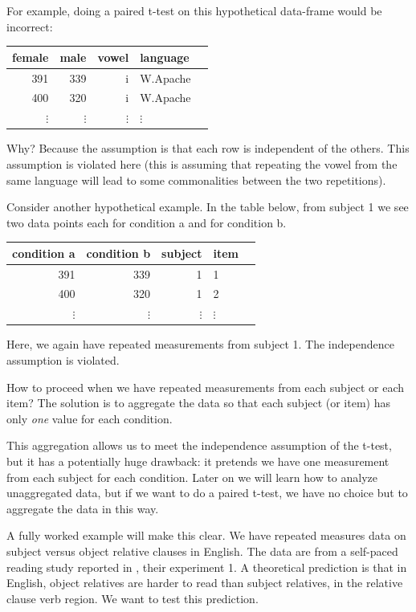 \documentclass[12pt,]{krantz}
\begin{document}
For example, doing a paired t-test on this hypothetical data-frame would be incorrect:

\begin{table}[ht]
\centering
\begin{tabular}{rrrll}
\hline
female & male & vowel & language \\ 
\hline
391 & 339 & i & W.Apache \\ 
400 & 320 & i & W.Apache \\ 
$\vdots$ & $\vdots$ & $\vdots$ & $\vdots$\\
\hline
\end{tabular}
\end{table}

Why? Because the assumption is that each row is independent of the others. This assumption is violated here (this is assuming that repeating the vowel from the same language will lead to some commonalities between the two repetitions).

Consider another hypothetical example. In the table below, from subject 1 we see two data points each for condition a and for condition b.

\begin{table}[ht]
\centering
\begin{tabular}{rrrll}
\hline
condition a & condition b & subject & item \\ 
\hline
391 & 339 & 1 & 1 \\ 
400 & 320 & 1 & 2 \\ 
$\vdots$ & $\vdots$ & $\vdots$ & $\vdots$\\
\hline
\end{tabular}
\end{table}

Here, we again have repeated measurements from subject 1. The independence assumption is violated.

How to proceed when we have repeated measurements from each subject or each item?
The solution is to aggregate the data so that each subject (or item) has only \emph{one} value for each condition.

This aggregation allows us to meet the independence assumption of the t-test, but it has a potentially huge drawback: it pretends we have one measurement from each subject for each condition.
Later on we will learn how to analyze unaggregated data, but if we want to do a paired t-test, we have no choice but to aggregate the data in this way.

A fully worked example will make this clear. We have repeated measures data on subject versus object relative clauses in English. The data are from a self-paced reading study reported in \citet{grodner}, their experiment 1. A theoretical prediction is that in English, object relatives are harder to read than subject relatives, in the relative clause verb region. We want to test this prediction.
\end{document}
